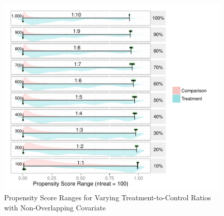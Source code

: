 \documentclass[letterpaper,12p,twoside]{article} %
\begin{document}
\begin{singlespace}
\begin{figure}[h!]
\begin{center}
\includegraphics[width=\textwidth]{../Figures2009/PSRanges-NoOverlap.pdf}
\caption{Propensity Score Ranges for Varying Treatment-to-Control Ratios with Non-Overlapping Covariate}
\end{center}
\end{figure}

\end{singlespace}


\end{document}
